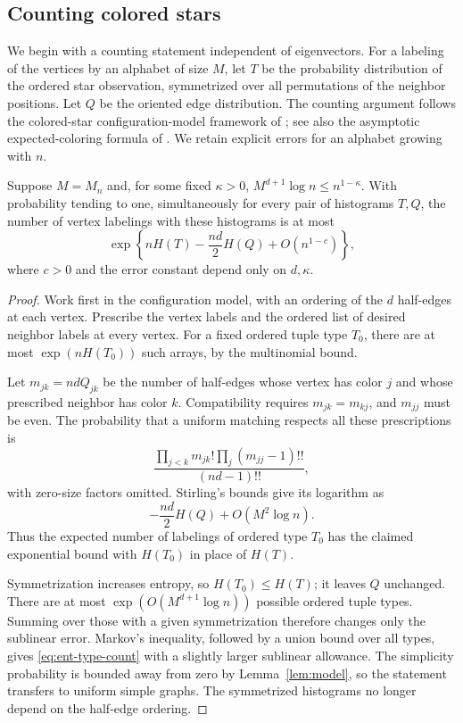 \subsection{Counting colored stars}

We begin with a counting statement independent of eigenvectors.
For a labeling of the vertices by an alphabet of size \(M\), let \(T\)
be the probability distribution of the ordered star observation,
symmetrized over all permutations of the neighbor positions. Let \(Q\)
be the oriented edge distribution.
The counting argument follows the colored-star configuration-model
framework of \citet[Section~4]{BackhauszSzegedyTrees}; see also the
asymptotic expected-coloring formula of
\citet[Theorem~2.3]{BackhauszBordenaveSzegedy}.
We retain explicit errors for an alphabet growing with \(n\).

\begin{lemma}\label{ent:type-count}
Suppose \(M=M_n\) and, for some fixed \(\kappa>0\),
\(M^{d+1}\log n\le n^{1-\kappa}\).
With probability tending to one, simultaneously for every pair of
histograms \(T,Q\), the number of vertex labelings with these histograms
is at most
\begin{equation}\label{eq:ent-type-count}
 \exp\left\{nH(T)-\frac{nd}{2}H(Q)+O(n^{1-c})\right\},
\end{equation}
where \(c>0\) and the error constant depend only on \(d,\kappa\).
\end{lemma}

\begin{proof}
Work first in the configuration model, with an ordering of the \(d\)
half-edges at each vertex. Prescribe the vertex labels and the ordered
list of desired neighbor labels at every vertex. For a fixed ordered
tuple type \(T_0\), there are at most \(\exp(nH(T_0))\) such arrays, by
the multinomial bound.

Let \(m_{jk}=ndQ_{jk}\) be the number of half-edges whose vertex has
color \(j\) and whose prescribed neighbor has color \(k\).
Compatibility requires \(m_{jk}=m_{kj}\), and \(m_{jj}\) must be even.
The probability that a uniform matching respects all these prescriptions is
\[
 \frac{\displaystyle\prod_{j<k}m_{jk}!
                    \prod_j(m_{jj}-1)!!}{(nd-1)!!},
\]
with zero-size factors omitted. Stirling's bounds give its logarithm as
\[
 -\frac{nd}{2}H(Q)+O(M^2\log n).
\]
Thus the expected number of labelings of ordered type \(T_0\) has the
claimed exponential bound with \(H(T_0)\) in place of \(H(T)\).

Symmetrization increases entropy, so \(H(T_0)\le H(T)\); it leaves \(Q\)
unchanged. There are at most
\(\exp(O(M^{d+1}\log n))\) possible ordered tuple types. Summing over
those with a given symmetrization therefore changes only the sublinear
error. Markov's inequality, followed by a union bound over all types,
gives \eqref{eq:ent-type-count} with a slightly larger sublinear
allowance. The simplicity probability is bounded away from zero by
Lemma~\ref{lem:model}, so the statement transfers to uniform simple
graphs. The symmetrized histograms no longer depend on the half-edge
ordering.
\end{proof}

